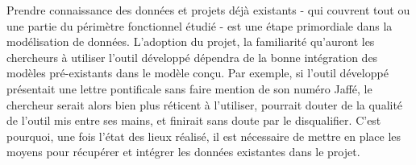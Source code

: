 Prendre connaissance des données et projets déjà existants -  qui couvrent tout ou une partie du périmètre fonctionnel étudié - est une étape primordiale dans la modélisation de données. L’adoption du projet, la familiarité qu’auront les chercheurs à utiliser l’outil développé dépendra de la bonne intégration des modèles pré-existants dans le modèle conçu.
Par exemple, si l’outil développé présentait une lettre pontificale sans faire mention de son numéro Jaffé, le chercheur serait alors bien plus réticent à l’utiliser, pourrait douter de la qualité de l’outil mis entre ses mains, et finirait sans doute par le disqualifier.
C’est pourquoi, une fois l’état des lieux réalisé, il est nécessaire de mettre en place les moyens pour récupérer et intégrer les données existantes dans le projet.


